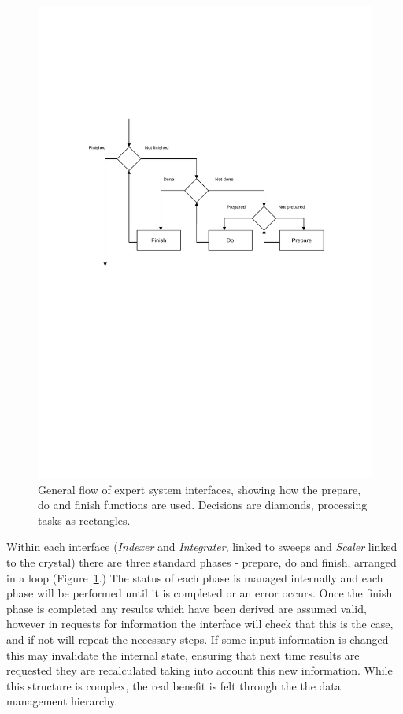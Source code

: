 \documentclass[preprint,pdf]{iucr}
\begin{document}
\begin{figure}
\caption{General flow of expert system interfaces, showing how the
  prepare, do and finish functions are used. Decisions are diamonds,
  processing tasks as rectangles.
\label{figure:fig6}}
\centering
\includegraphics[scale=0.5]{figures/Fig6.pdf}
\end{figure}

Within each interface (\emph{Indexer} and \emph{Integrater}, linked to
sweeps and 
\emph{Scaler} linked to the crystal) there are three standard phases -
prepare, do and 
finish, arranged in a loop (Figure~\ref{figure:fig6}.) 
The status of each phase is
managed internally and each phase will be performed until it is
completed or an error occurs. Once the finish phase is completed any
results which have been derived are assumed valid, however in requests
for information the interface will check that this is the case, and if
not will repeat the necessary steps. If some input information is
changed this may invalidate the internal state, ensuring that next
time results are requested they are recalculated taking into account
this new information. While this structure is complex, the
real benefit is felt through the the data management hierarchy.
\end{document}
